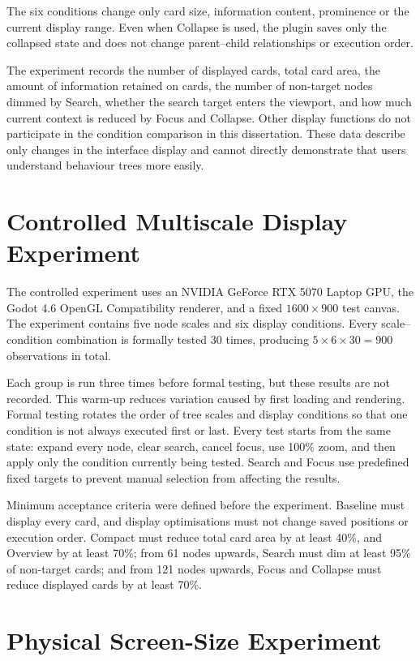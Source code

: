 The six conditions change only card size, information content, prominence or the current display range. Even when Collapse is used, the plugin saves only the collapsed state and does not change parent--child relationships or execution order.

The experiment records the number of displayed cards, total card area, the amount of information retained on cards, the number of non-target nodes dimmed by Search, whether the search target enters the viewport, and how much current context is reduced by Focus and Collapse. Other display functions do not participate in the condition comparison in this dissertation. These data describe only changes in the interface display and cannot directly demonstrate that users understand behaviour trees more easily.

\section{Controlled Multiscale Display Experiment}

The controlled experiment uses an NVIDIA GeForce RTX 5070 Laptop GPU, the Godot 4.6 OpenGL Compatibility renderer, and a fixed \(1600 \times 900\) test canvas. The experiment contains five node scales and six display conditions. Every scale--condition combination is formally tested 30 times, producing \(5 \times 6 \times 30 = 900\) observations in total.

Each group is run three times before formal testing, but these results are not recorded. This warm-up reduces variation caused by first loading and rendering. Formal testing rotates the order of tree scales and display conditions so that one condition is not always executed first or last. Every test starts from the same state: expand every node, clear search, cancel focus, use 100\% zoom, and then apply only the condition currently being tested. Search and Focus use predefined fixed targets to prevent manual selection from affecting the results.

Minimum acceptance criteria were defined before the experiment. Baseline must display every card, and display optimisations must not change saved positions or execution order. Compact must reduce total card area by at least 40\%, and Overview by at least 70\%; from 61 nodes upwards, Search must dim at least 95\% of non-target cards; and from 121 nodes upwards, Focus and Collapse must reduce displayed cards by at least 70\%.

\section{Physical Screen-Size Experiment}

